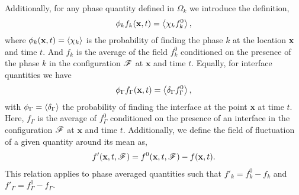 \documentclass[11pt]{My_preprint}
\begin{document}
Additionally, for any phase quantity defined in $\Omega_k$ we introduce the definition, 
\begin{equation}
    \phi_k f_k (\textbf{x},t) = \avg{\chi_k f_k^0},
    \label{eq:1_avg}
\end{equation}
where $\phi_k(\textbf{x},t) = \left<\chi_k\right>$ is the probability of finding the phase $k$ at the location \textbf{x} and time $t$.
And $f_k$ is the average of the field $f_k^0$ conditioned on the presence of the phase $k$ in the configuration $\mathscr{F}$ at $\textbf{x}$ and time $t$.
Equally, for interface quantities we have 
\begin{equation}
    \phi_\Gamma f_\Gamma (\textbf{x},t) = \left<\delta_\Gamma f_\Gamma^0\right>,
\end{equation}
with $\phi_\Gamma = \left<\delta_\Gamma\right>$ the probability of finding the interface at the point \textbf{x} at time $t$. 
Here, $f_\Gamma$ is the average of $f^0_\Gamma$ conditioned on the presence of an interface in the configuration $\mathscr{F}$ at $\textbf{x}$ and time $t$. 
Additionally, we define the field of fluctuation of a given quantity around its mean as,
\begin{align}
    f'(\textbf{x},t,\FF) = f^0(\textbf{x},t,\FF) - f(\textbf{x},t).
    \label{eq:def_fluctu}
\end{align}
This relation applies to phase averaged quantities such that $f'_k = f^0_k - f_k$ and $f'_\Gamma = f^0_\Gamma - f_\Gamma$. 
\end{document}
